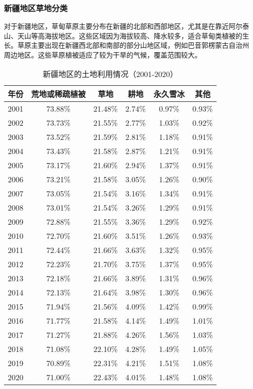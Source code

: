 \documentclass[AutoFakeBold]{LZUThesis-PgD&PhD}
\begin{document}
    \subsubsection{新疆地区草地分类}
	对于新疆地区，草甸草原主要分布在新疆的北部和西部地区，尤其是在靠近阿尔泰山、天山等高海拔地区。这些区域因为海拔较高、降水较多，适合草甸类植被的生长。草原主要出现在新疆西北部和南部的部分山地区域，例如巴音郭楞蒙古自治州周边地区。这些草原植被适应了较为干旱的气候，覆盖范围较大。
	
    
    \begin{table}[H]
        \centering
        \begin{tabular}{|c|c|c|c|c|c|}
            \hline
            年份 & 荒地或稀疏植被 & 草地 & 耕地 & 永久雪冰 & 其他 \\
            \hline
            2001 & 73.88\% & 21.48\% & 2.74\% & 0.97\% & 0.93\% \\
            2002 & 73.73\% & 21.55\% & 2.77\% & 1.03\% & 0.92\% \\
            2003 & 73.52\% & 21.59\% & 2.81\% & 1.18\% & 0.91\% \\
            2004 & 73.43\% & 21.58\% & 2.87\% & 1.21\% & 0.91\% \\
            2005 & 73.17\% & 21.60\% & 2.94\% & 1.37\% & 0.91\% \\
            2006 & 73.21\% & 21.58\% & 3.05\% & 1.26\% & 0.90\% \\
            2007 & 73.05\% & 21.54\% & 3.16\% & 1.34\% & 0.91\% \\
            2008 & 73.01\% & 21.54\% & 3.26\% & 1.29\% & 0.91\% \\
            2009 & 72.88\% & 21.55\% & 3.36\% & 1.29\% & 0.92\% \\
            2010 & 72.70\% & 21.60\% & 3.51\% & 1.26\% & 0.93\% \\
            2011 & 72.44\% & 21.66\% & 3.63\% & 1.32\% & 0.95\% \\
            2012 & 72.23\% & 21.70\% & 3.75\% & 1.37\% & 0.95\% \\
            2013 & 72.18\% & 21.66\% & 3.89\% & 1.31\% & 0.96\% \\
            2014 & 72.13\% & 21.64\% & 3.98\% & 1.30\% & 0.96\% \\
            2015 & 71.94\% & 21.56\% & 4.09\% & 1.42\% & 0.99\% \\
            2016 & 71.77\% & 21.58\% & 4.14\% & 1.49\% & 1.01\% \\
            2017 & 71.27\% & 21.88\% & 4.26\% & 1.56\% & 1.03\% \\
            2018 & 71.08\% & 22.10\% & 4.28\% & 1.49\% & 1.05\% \\
            2019 & 70.89\% & 22.31\% & 4.21\% & 1.51\% & 1.08\% \\
            2020 & 71.00\% & 22.43\% & 4.01\% & 1.48\% & 1.08\% \\
            \hline
        \end{tabular}
        \caption{新疆地区的土地利用情况（2001-2020）}
    \end{table}
  
\end{document}
